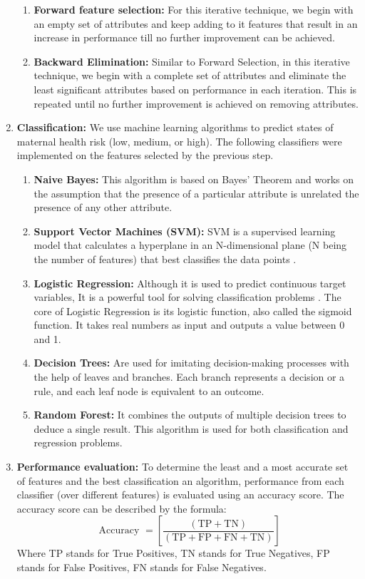 \documentclass[conference]{IEEEtran}
\begin{document}
\begin{enumerate}
\begin{enumerate}
        \item \textbf{Forward feature selection: } For this iterative technique, we begin with an empty set of attributes and keep adding to it features that result in an increase in performance till no further improvement can be achieved.
        \item \textbf{Backward Elimination: } Similar to Forward Selection, in this iterative technique, we begin with a complete set of attributes and eliminate the least significant attributes based on performance in each iteration. This is repeated until no further improvement is achieved on removing attributes.
    \end{enumerate}
    \item \textbf{Classification: }We use machine learning algorithms to predict states of maternal health risk (low, medium, or high). The following classifiers were implemented on the features selected by the previous step.
    \begin{enumerate}
        \item \textbf{Naive Bayes:} This algorithm is based on Bayes' Theorem \cite{bayestheorem} and works on the assumption that the presence of a particular attribute is unrelated the presence of any other attribute. 
        \item \textbf{Support Vector Machines (SVM): } SVM is a supervised learning model that calculates a hyperplane in an N-dimensional plane (N being the number of features) that best classifies the data points \cite{svm}.
        \item \textbf{Logistic Regression: } Although it is used to predict continuous target variables, It is a powerful tool for solving classification problems \cite{logreg}. The core of Logistic Regression is its logistic function, also called the sigmoid function. It takes real numbers as input and outputs a value between 0 and 1. 
        \item \textbf{Decision Trees: } Are used for imitating decision-making processes with the help of leaves and branches. Each branch represents a decision or a rule, and each leaf node is equivalent to an outcome.  
        \item \textbf{Random Forest: } It combines the outputs of multiple decision trees to deduce a single result. This algorithm is used for both classification and regression problems.
        
    \end{enumerate}
    \item \textbf{Performance evaluation: }To determine the least and a most accurate set of features and the best classification an algorithm, performance from each classifier (over different features) is evaluated using an accuracy score. The accuracy score can be described by the formula: \\
    \begin{equation}
\text { Accuracy }=[\dfrac{(\mathrm{TP}+\mathrm{TN}) }{(\mathrm{TP}+\mathrm{FP}+\mathrm{FN}+\mathrm{TN})}]
\end{equation}
Where TP stands for True Positives, TN stands for True Negatives, FP stands for False Positives, FN stands for False Negatives.
\end{enumerate}
\end{document}
